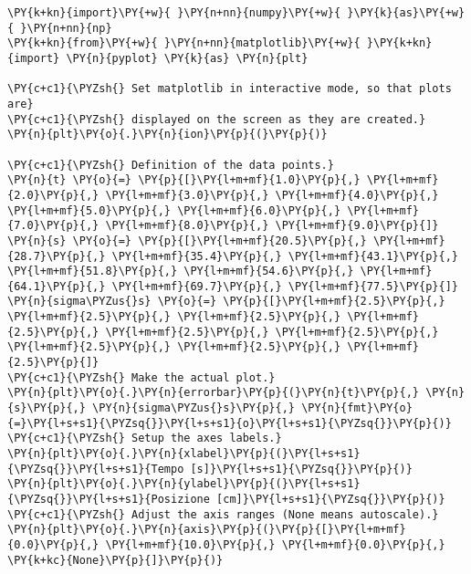 \begin{Verbatim}[label=\makebox{\href{https://github.com/unipi-physics-labs/statnotes/tree/main/snippy/scatter_plot.py}{https://github.com/.../scatter\_plot.py}},commandchars=\\\{\}]
\PY{k+kn}{import}\PY{+w}{ }\PY{n+nn}{numpy}\PY{+w}{ }\PY{k}{as}\PY{+w}{ }\PY{n+nn}{np}
\PY{k+kn}{from}\PY{+w}{ }\PY{n+nn}{matplotlib}\PY{+w}{ }\PY{k+kn}{import} \PY{n}{pyplot} \PY{k}{as} \PY{n}{plt}

\PY{c+c1}{\PYZsh{} Set matplotlib in interactive mode, so that plots are}
\PY{c+c1}{\PYZsh{} displayed on the screen as they are created.}
\PY{n}{plt}\PY{o}{.}\PY{n}{ion}\PY{p}{(}\PY{p}{)}

\PY{c+c1}{\PYZsh{} Definition of the data points.}
\PY{n}{t} \PY{o}{=} \PY{p}{[}\PY{l+m+mf}{1.0}\PY{p}{,} \PY{l+m+mf}{2.0}\PY{p}{,} \PY{l+m+mf}{3.0}\PY{p}{,} \PY{l+m+mf}{4.0}\PY{p}{,} \PY{l+m+mf}{5.0}\PY{p}{,} \PY{l+m+mf}{6.0}\PY{p}{,} \PY{l+m+mf}{7.0}\PY{p}{,} \PY{l+m+mf}{8.0}\PY{p}{,} \PY{l+m+mf}{9.0}\PY{p}{]}
\PY{n}{s} \PY{o}{=} \PY{p}{[}\PY{l+m+mf}{20.5}\PY{p}{,} \PY{l+m+mf}{28.7}\PY{p}{,} \PY{l+m+mf}{35.4}\PY{p}{,} \PY{l+m+mf}{43.1}\PY{p}{,} \PY{l+m+mf}{51.8}\PY{p}{,} \PY{l+m+mf}{54.6}\PY{p}{,} \PY{l+m+mf}{64.1}\PY{p}{,} \PY{l+m+mf}{69.7}\PY{p}{,} \PY{l+m+mf}{77.5}\PY{p}{]}
\PY{n}{sigma\PYZus{}s} \PY{o}{=} \PY{p}{[}\PY{l+m+mf}{2.5}\PY{p}{,} \PY{l+m+mf}{2.5}\PY{p}{,} \PY{l+m+mf}{2.5}\PY{p}{,} \PY{l+m+mf}{2.5}\PY{p}{,} \PY{l+m+mf}{2.5}\PY{p}{,} \PY{l+m+mf}{2.5}\PY{p}{,} \PY{l+m+mf}{2.5}\PY{p}{,} \PY{l+m+mf}{2.5}\PY{p}{,} \PY{l+m+mf}{2.5}\PY{p}{]}
\PY{c+c1}{\PYZsh{} Make the actual plot.}
\PY{n}{plt}\PY{o}{.}\PY{n}{errorbar}\PY{p}{(}\PY{n}{t}\PY{p}{,} \PY{n}{s}\PY{p}{,} \PY{n}{sigma\PYZus{}s}\PY{p}{,} \PY{n}{fmt}\PY{o}{=}\PY{l+s+s1}{\PYZsq{}}\PY{l+s+s1}{o}\PY{l+s+s1}{\PYZsq{}}\PY{p}{)}
\PY{c+c1}{\PYZsh{} Setup the axes labels.}
\PY{n}{plt}\PY{o}{.}\PY{n}{xlabel}\PY{p}{(}\PY{l+s+s1}{\PYZsq{}}\PY{l+s+s1}{Tempo [s]}\PY{l+s+s1}{\PYZsq{}}\PY{p}{)}
\PY{n}{plt}\PY{o}{.}\PY{n}{ylabel}\PY{p}{(}\PY{l+s+s1}{\PYZsq{}}\PY{l+s+s1}{Posizione [cm]}\PY{l+s+s1}{\PYZsq{}}\PY{p}{)}
\PY{c+c1}{\PYZsh{} Adjust the axis ranges (None means autoscale).}
\PY{n}{plt}\PY{o}{.}\PY{n}{axis}\PY{p}{(}\PY{p}{[}\PY{l+m+mf}{0.0}\PY{p}{,} \PY{l+m+mf}{10.0}\PY{p}{,} \PY{l+m+mf}{0.0}\PY{p}{,} \PY{k+kc}{None}\PY{p}{]}\PY{p}{)}
\end{Verbatim}
